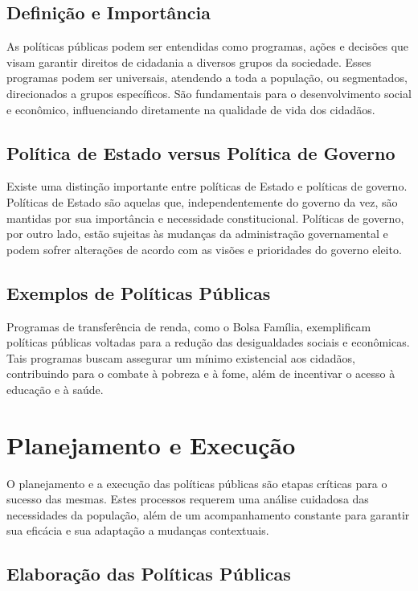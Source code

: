 \documentclass[
   article,       
   12pt,          
   oneside,       
   a4paper,       
   english,       
   brazil,        
   sumario=tradicional
   ]{abntex2}
\begin{document}
\subsection{Definição e Importância}

As políticas públicas podem ser entendidas como programas, ações e decisões que visam garantir direitos de cidadania a diversos grupos da sociedade. Esses programas podem ser universais, atendendo a toda a população, ou segmentados, direcionados a grupos específicos. São fundamentais para o desenvolvimento social e econômico, influenciando diretamente na qualidade de vida dos cidadãos.

\subsection{Política de Estado versus Política de Governo}

Existe uma distinção importante entre políticas de Estado e políticas de governo. Políticas de Estado são aquelas que, independentemente do governo da vez, são mantidas por sua importância e necessidade constitucional. Políticas de governo, por outro lado, estão sujeitas às mudanças da administração governamental e podem sofrer alterações de acordo com as visões e prioridades do governo eleito.

\subsection{Exemplos de Políticas Públicas}

Programas de transferência de renda, como o Bolsa Família, exemplificam políticas públicas voltadas para a redução das desigualdades sociais e econômicas. Tais programas buscam assegurar um mínimo existencial aos cidadãos, contribuindo para o combate à pobreza e à fome, além de incentivar o acesso à educação e à saúde.

\section{Planejamento e Execução}

O planejamento e a execução das políticas públicas são etapas críticas para o sucesso das mesmas. Estes processos requerem uma análise cuidadosa das necessidades da população, além de um acompanhamento constante para garantir sua eficácia e sua adaptação a mudanças contextuais.

\subsection{Elaboração das Políticas Públicas}
\end{document}
